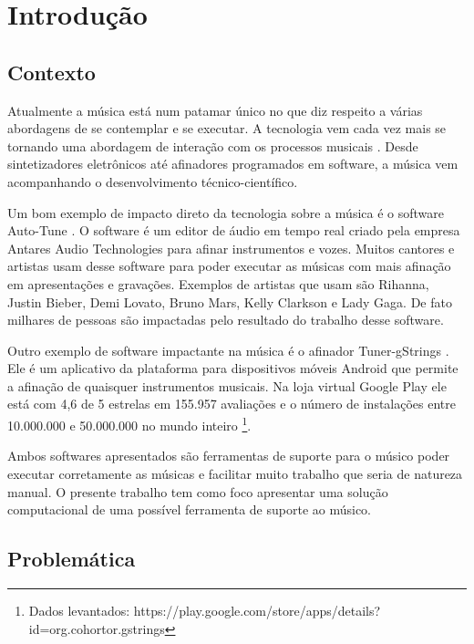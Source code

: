 \chapter[Introdução]{Introdução}
\label{chap:introducao}

\section{Contexto}
\label{sec:contexto}

Atualmente a música está num patamar único no que diz respeito a várias abordagens de se contemplar e se executar. A tecnologia vem cada vez mais se tornando uma abordagem de interação com os processos musicais \cite{makingmusictechnology}. Desde sintetizadores eletrônicos até afinadores programados em software, a música vem acompanhando o desenvolvimento técnico-científico.

Um bom exemplo de impacto direto da tecnologia sobre a música é o software Auto-Tune \cite{autotune}. O software é um editor de áudio em tempo real criado pela empresa Antares Audio Technologies \cite{autotune2} para afinar instrumentos e vozes. Muitos cantores e artistas usam desse software para poder executar as músicas com mais afinação em apresentações e gravações. Exemplos de artistas que usam são Rihanna, Justin Bieber, Demi Lovato, Bruno Mars, Kelly Clarkson e Lady Gaga. De fato milhares de pessoas são impactadas pelo resultado do trabalho desse software.

Outro exemplo de software impactante na música é o afinador Tuner-gStrings \cite{afinador}. Ele é um aplicativo da plataforma para dispositivos móveis Android que permite a afinação de quaisquer instrumentos musicais. Na loja virtual Google Play ele está com 4,6 de 5 estrelas em 155.957 avaliações e o número de instalações entre 10.000.000 e 50.000.000 no mundo inteiro \footnote{Dados levantados: https://play.google.com/store/apps/details?id=org.cohortor.gstrings}.

Ambos softwares apresentados são ferramentas de suporte para o músico poder executar corretamente as músicas e facilitar muito trabalho que seria de natureza manual. O presente trabalho tem como foco apresentar uma solução computacional de uma possível ferramenta de suporte ao músico.


\section{Problemática}
\label{sec:problematica}

